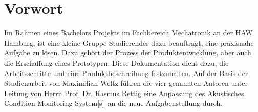 \section{Vorwort}

Im Rahmen eines Bachelors Projekts im Fachbereich Mechatronik an der HAW Hamburg, ist eine kleine Gruppe Studierender dazu beauftragt, eine praxisnahe Aufgabe zu lösen. Dazu gehört der Prozess der Produktentwicklung, aber auch die Erschaffung eines Prototypen. Diese Dokumentation dient dazu, die Arbeitsschritte und eine Produktbeschreibung festzuhalten. Auf der Basis der Studienarbeit von Maximilian Weltz führen die vier genannten Autoren unter Leitung von Herrn Prof. Dr. Rasmus Rettig eine Anpassung des \glqq Akustisches Condition Monitoring System[s]\grqq\ an die neue Aufgabenstellung durch.
\newpage